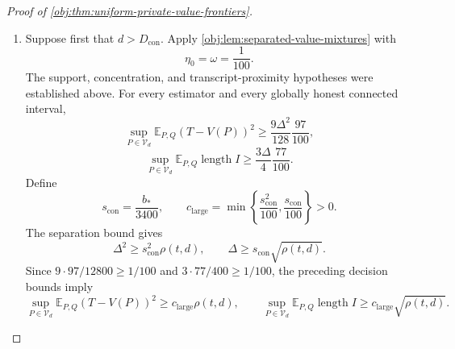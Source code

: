 \begin{proof}[Proof of \cref{obj:thm:uniform-private-value-frontiers}]
\begin{enumerate}
It remains to bound the geometric expression uniformly. In both branches,
\[
kw_{\mathrm{con}}\ge32L,
\qquad
\gamma_{\mathrm{con}}^2=\frac{\alpha^2eL}{kz_*}.
\]
For \(z_*\le1\), the amplitude formula and \(e<3\) give
\[
\alpha^2e\,w_{\mathrm{con}}e^{w_{\mathrm{con}}/2}
=\frac{z_*}{10000}e\,e^{1/2}
\le32z_*.
\]
For \(z_*>1\), use
\[
e^w=e+z_*,
\qquad
w\le2e^{w/2},
\]
the latter following from \(1+w/2\le e^{w/2}\). Thus
\[
we^{w/2}\le2(e+z_*)\le8z_*,
\qquad
\alpha^2e\,we^{w/2}\le32z_*.
\]
Combining either budget inequality with \(kw_{\mathrm{con}}\ge32L\) yields
\[
\gamma_{\mathrm{con}}^2
\le e^{-w_{\mathrm{con}}/2},
\qquad
\gamma_{\mathrm{con}}\le e^{-w_{\mathrm{con}}/4}.
\]
Since \(d\le e^L\) and \(L\ge1\),
\[
d\gamma_{\mathrm{con}}^k
\le de^{-kw_{\mathrm{con}}/4}
\le de^{-8L}
\le e^{-7L}
\le e^{-7}
\le\frac1{100}.
\]
For the last inequality, \(e\ge2\) gives \(e^7\ge128\).
Consequently, for every sequential protocol,
\[
\operatorname{TV}(\mathsf M_0^Q,\mathsf M_1^Q)\le\frac1{100}.
\]
The sampling and randomness assumptions identify these mixtures with the joint seed-transcript mixtures under the fixed sampling scheme; the independent analyst randomizer supplies the decision mixtures required by \cref{obj:lem:separated-value-mixtures}.

\item
Suppose first that \(d>D_{\mathrm{con}}\). Apply \cref{obj:lem:separated-value-mixtures} with
\[
\eta_0=\omega=\frac1{100}.
\]
The support, concentration, and transcript-proximity hypotheses were established above. For every estimator and every globally honest connected interval,
\[
\sup_{P\in\mathcal V_d}
\mathbb E_{P,Q}(T-V(P))^2
\ge\frac{9\Delta^2}{128}\frac{97}{100},
\]
\[
\sup_{P\in\mathcal V_d}
\mathbb E_{P,Q}\operatorname{length}I
\ge\frac{3\Delta}{4}\frac{77}{100}.
\]
Define
\[
s_{\mathrm{con}}=\frac{b_*}{3400},
\qquad
c_{\mathrm{large}}
=\min\left\{\frac{s_{\mathrm{con}}^2}{100},
                 \frac{s_{\mathrm{con}}}{100}\right\}>0.
\]
The separation bound gives
\[
\Delta^2\ge s_{\mathrm{con}}^2\rho(t,d),
\qquad
\Delta\ge s_{\mathrm{con}}\sqrt{\rho(t,d)}.
\]
Since \(9\cdot97/12800\ge1/100\) and
\(3\cdot77/400\ge1/100\), the preceding decision bounds imply
\[
\sup_{P\in\mathcal V_d}\mathbb E_{P,Q}(T-V(P))^2
\ge c_{\mathrm{large}}\rho(t,d),
\qquad
\sup_{P\in\mathcal V_d}\mathbb E_{P,Q}\operatorname{length}I
\ge c_{\mathrm{large}}\sqrt{\rho(t,d)}.
\]


\end{enumerate}
\end{proof}
